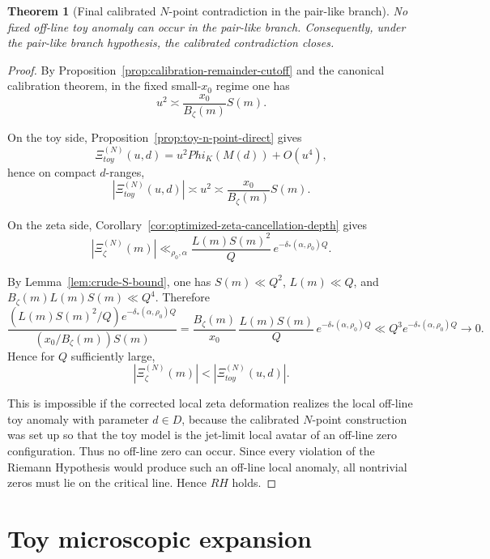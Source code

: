 \documentclass[11pt,a4paper]{amsart}
\def\Phi{Phi}%
\def\RH{RH}%
\def\toy{toy}%
\theoremstyle{plain}
\newtheorem{theorem}{Theorem}[section]
\theoremstyle{definition}
\newcommand{\RH}{\mathrm{RH}}
\newcommand{\toy}{\mathrm{toy}}
\begin{document}
\begin{theorem}[Final calibrated $N$-point contradiction in the pair-like branch]
\label{thm:final-contradiction}
No fixed off-line toy anomaly can occur in the pair-like branch. Consequently,
under the pair-like branch hypothesis, the calibrated contradiction closes.
\end{theorem}

\begin{proof}
By Proposition~\ref{prop:calibration-remainder-cutoff} and the canonical
calibration theorem, in the fixed small-$x_0$ regime one has
\[
u^2\asymp \frac{x_0}{B_\zeta(m)}S(m).
\]

On the toy side, Proposition~\ref{prop:toy-n-point-direct} gives
\[
\Xi_{\toy}^{(N)}(u,d)=u^2\Phi_K(M(d))+O(u^4),
\]
hence on compact $d$-ranges,
\[
|\Xi_{\toy}^{(N)}(u,d)|\asymp u^2
\asymp
\frac{x_0}{B_\zeta(m)}S(m).
\]

On the zeta side, Corollary~\ref{cor:optimized-zeta-cancellation-depth} gives
\[
|\Xi_\zeta^{(N)}(m)|
\ll_{\rho_0,\alpha}
\frac{L(m)S(m)^2}{Q}\,
e^{-\delta_*(\alpha,\rho_0)Q}.
\]

By Lemma~\ref{lem:crude-S-bound}, one has $S(m)\ll Q^2$, $L(m)\ll Q$, and
$B_\zeta(m)L(m)S(m)\ll Q^4$. Therefore
\[
\frac{(L(m)S(m)^2/Q)e^{-\delta_*(\alpha,\rho_0)Q}}
{(x_0/B_\zeta(m))S(m)}
=
\frac{B_\zeta(m)}{x_0}\,\frac{L(m)S(m)}{Q}\,
e^{-\delta_*(\alpha,\rho_0)Q}
\ll
Q^3 e^{-\delta_*(\alpha,\rho_0)Q}\to 0.
\]
Hence for $Q$ sufficiently large,
\[
|\Xi_\zeta^{(N)}(m)|<|\Xi_{\toy}^{(N)}(u,d)|.
\]

This is impossible if the corrected local zeta deformation realizes the local
off-line toy anomaly with parameter $d\in D$, because the calibrated $N$-point
construction was set up so that the toy model is the jet-limit local avatar of
an off-line zero configuration. Thus no off-line zero can occur. Since every
violation of the Riemann Hypothesis would produce such an off-line local
anomaly, all nontrivial zeros must lie on the critical line. Hence $\RH$
holds.
\end{proof}

\appendix

\section{Toy microscopic expansion}
\label{app:toy-microscopic-expansion}
\end{document}
